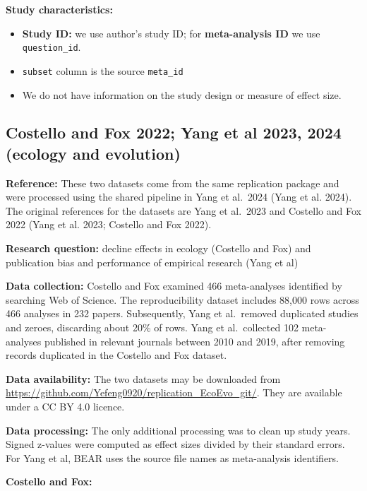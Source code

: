 \documentclass[
  11pt,
]{article}
\providecommand{\tightlist}{%
  \setlength{\itemsep}{0pt}\setlength{\parskip}{0pt}}
\begin{document}
\textbf{Study characteristics:}

\begin{itemize}
\tightlist
\item
  \textbf{Study ID:} we use author's study ID; for \textbf{meta-analysis
  ID} we use \texttt{question\_id}.
\item
  \texttt{subset} column is the source \texttt{meta\_id}
\item
  We do not have information on the study design or measure of effect
  size.
\end{itemize}

\newpage

\subsection{Costello and Fox 2022; Yang et al 2023, 2024 (ecology and
evolution)}\label{costello-and-fox-2022-yang-et-al-2023-2024-ecology-and-evolution}

\textbf{Reference:} These two datasets come from the same replication
package and were processed using the shared pipeline in Yang et al.~2024
(Yang et al. 2024). The original references for the datasets are Yang et
al.~2023 and Costello and Fox 2022 (Yang et al. 2023; Costello and Fox
2022).

\textbf{Research question:} decline effects in ecology (Costello and
Fox) and publication bias and performance of empirical research (Yang et
al)

\textbf{Data collection:} Costello and Fox examined 466 meta-analyses
identified by searching Web of Science. The reproducibility dataset
includes 88,000 rows across 466 analyses in 232 papers. Subsequently,
Yang et al.~removed duplicated studies and zeroes, discarding about 20\%
of rows. Yang et al.~collected 102 meta-analyses published in relevant
journals between 2010 and 2019, after removing records duplicated in the
Costello and Fox dataset.

\textbf{Data availability:} The two datasets may be downloaded from
\url{https://github.com/Yefeng0920/replication_EcoEvo_git/}. They are
available under a CC BY 4.0 licence.

\textbf{Data processing:} The only additional processing was to clean up
study years. Signed z-values were computed as effect sizes divided by
their standard errors. For Yang et al, BEAR uses the source file names
as meta-analysis identifiers.

\textbf{Costello and Fox:}
\end{document}
